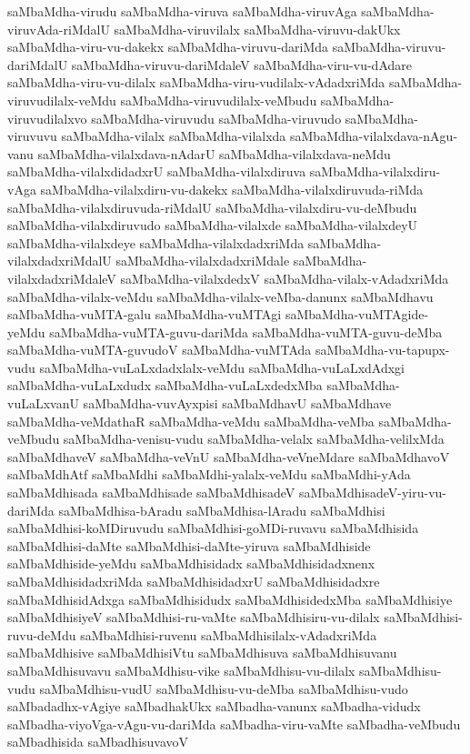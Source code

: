 {saMbaMdha-virudu
saMbaMdha-viruva
saMbaMdha-viruvAga
saMbaMdha-viruvAda-riMdalU
saMbaMdha-viruvilalx
saMbaMdha-viruvu-dakUkx
saMbaMdha-viru-vu-dakekx
saMbaMdha-viruvu-dariMda
saMbaMdha-viruvu-dariMdalU
saMbaMdha-viruvu-dariMdaleV
saMbaMdha-viru-vu-dAdare
saMbaMdha-viru-vu-dilalx
saMbaMdha-viru-vudilalx-vAdadxriMda
saMbaMdha-viruvudilalx-veMdu
saMbaMdha-viruvudilalx-veMbudu
saMbaMdha-viruvudilalxvo
saMbaMdha-viruvudu
saMbaMdha-viruvudo
saMbaMdha-viruvuvu
saMbaMdha-vilalx
saMbaMdha-vilalxda
saMbaMdha-vilalxdava-nAgu-vanu
saMbaMdha-vilalxdava-nAdarU
saMbaMdha-vilalxdava-neMdu
saMbaMdha-vilalxdidadxrU
saMbaMdha-vilalxdiruva
saMbaMdha-vilalxdiru-vAga
saMbaMdha-vilalxdiru-vu-dakekx
saMbaMdha-vilalxdiruvuda-riMda
saMbaMdha-vilalxdiruvuda-riMdalU
saMbaMdha-vilalxdiru-vu-deMbudu
saMbaMdha-vilalxdiruvudo
saMbaMdha-vilalxde
saMbaMdha-vilalxdeyU
saMbaMdha-vilalxdeye
saMbaMdha-vilalxdadxriMda
saMbaMdha-vilalxdadxriMdalU
saMbaMdha-vilalxdadxriMdale
saMbaMdha-vilalxdadxriMdaleV
saMbaMdha-vilalxdedxV
saMbaMdha-vilalx-vAdadxriMda
saMbaMdha-vilalx-veMdu
saMbaMdha-vilalx-veMba-danunx
saMbaMdhavu
saMbaMdha-vuMTA-galu
saMbaMdha-vuMTAgi
saMbaMdha-vuMTAgide-yeMdu
saMbaMdha-vuMTA-guvu-dariMda
saMbaMdha-vuMTA-guvu-deMba
saMbaMdha-vuMTA-guvudoV
saMbaMdha-vuMTAda
saMbaMdha-vu-tapupx-vudu
saMbaMdha-vuLaLxdadxlalx-veMdu
saMbaMdha-vuLaLxdAdxgi
saMbaMdha-vuLaLxdudx
saMbaMdha-vuLaLxdedxMba
saMbaMdha-vuLaLxvanU
saMbaMdha-vuvAyxpisi
saMbaMdhavU
saMbaMdhave
saMbaMdha-veMdathaR
saMbaMdha-veMdu
saMbaMdha-veMba
saMbaMdha-veMbudu
saMbaMdha-venisu-vudu
saMbaMdha-velalx
saMbaMdha-velilxMda
saMbaMdhaveV
saMbaMdha-veVnU
saMbaMdha-veVneMdare
saMbaMdhavoV
saMbaMdhAtf
saMbaMdhi
saMbaMdhi-yalalx-veMdu
saMbaMdhi-yAda
saMbaMdhisada
saMbaMdhisade
saMbaMdhisadeV
saMbaMdhisadeV-yiru-vu-dariMda
saMbaMdhisa-bAradu
saMbaMdhisa-lAradu
saMbaMdhisi
saMbaMdhisi-koMDiruvudu
saMbaMdhisi-goMDi-ruvavu
saMbaMdhisida
saMbaMdhisi-daMte
saMbaMdhisi-daMte-yiruva
saMbaMdhiside
saMbaMdhiside-yeMdu
saMbaMdhisidadx
saMbaMdhisidadxnenx
saMbaMdhisidadxriMda
saMbaMdhisidadxrU
saMbaMdhisidadxre
saMbaMdhisidAdxga
saMbaMdhisidudx
saMbaMdhisidedxMba
saMbaMdhisiye
saMbaMdhisiyeV
saMbaMdhisi-ru-vaMte
saMbaMdhisiru-vu-dilalx
saMbaMdhisi-ruvu-deMdu
saMbaMdhisi-ruvenu
saMbaMdhisilalx-vAdadxriMda
saMbaMdhisive
saMbaMdhisiVtu
saMbaMdhisuva
saMbaMdhisuvanu
saMbaMdhisuvavu
saMbaMdhisu-vike
saMbaMdhisu-vu-dilalx
saMbaMdhisu-vudu
saMbaMdhisu-vudU
saMbaMdhisu-vu-deMba
saMbaMdhisu-vudo
saMbadadhx-vAgiye
saMbadhakUkx
saMbadha-vanunx
saMbadha-vidudx
saMbadha-viyoVga-vAgu-vu-dariMda
saMbadha-viru-vaMte
saMbadha-veMbudu
saMbadhisida
saMbadhisuvavoV
}

